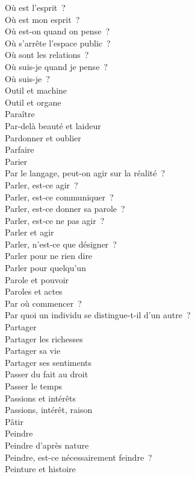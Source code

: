 \documentclass[a4paper,12pt]{article}
\begin{document}
Où est l'esprit ? \\
Où est mon esprit ? \\
Où est-on quand on pense ? \\
Où s'arrête l'espace public ? \\
Où sont les relations ? \\
Où suis-je quand je pense ? \\
Où suis-je ? \\
Outil et machine \\
Outil et organe \\
Paraître \\
Par-delà beauté et laideur \\
Pardonner et oublier \\
Parfaire \\
Parier \\
Par le langage, peut-on agir sur la réalité ? \\
Parler, est-ce agir ? \\
Parler, est-ce communiquer ? \\
Parler, est-ce donner sa parole ? \\
Parler, est-ce ne pas agir ? \\
Parler et agir \\
Parler, n'est-ce que désigner ? \\
Parler pour ne rien dire \\
Parler pour quelqu'un \\
Parole et pouvoir \\
Paroles et actes \\
Par où commencer ? \\
Par quoi un individu se distingue-t-il d'un autre ? \\
Partager \\
Partager les richesses \\
Partager sa vie \\
Partager ses sentiments \\
Passer du fait au droit \\
Passer le temps \\
Passions et intérêts \\
Passions, intérêt, raison \\
Pâtir \\
Peindre \\
Peindre d'après nature \\
Peindre, est-ce nécessairement feindre ? \\
Peinture et histoire \\
\end{document}
